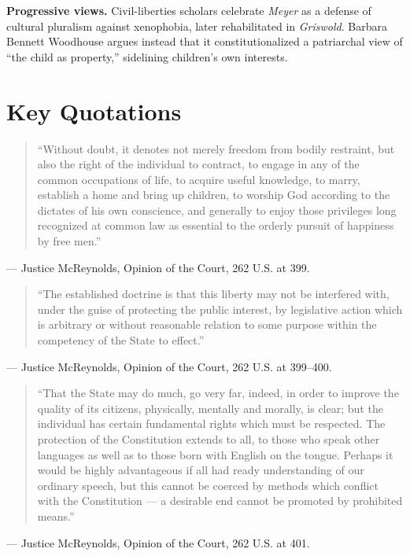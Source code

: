 \documentclass[12pt]{article}
\begin{document}
\textbf{Progressive views.} Civil-liberties scholars celebrate \textit{Meyer} as a defense of cultural pluralism against xenophobia, later rehabilitated in \textit{Griswold}. Barbara Bennett Woodhouse argues instead that it constitutionalized a patriarchal view of ``the child as property,'' sidelining children's own interests.

\section{Key Quotations}

\begin{quote}
``Without doubt, it denotes not merely freedom from bodily restraint, but also the right of the individual to contract, to engage in any of the common occupations of life, to acquire useful knowledge, to marry, establish a home and bring up children, to worship God according to the dictates of his own conscience, and generally to enjoy those privileges long recognized at common law as essential to the orderly pursuit of happiness by free men.''
\end{quote}
\noindent --- Justice McReynolds, Opinion of the Court, 262 U.S. at 399.

\begin{quote}
``The established doctrine is that this liberty may not be interfered with, under the guise of protecting the public interest, by legislative action which is arbitrary or without reasonable relation to some purpose within the competency of the State to effect.''
\end{quote}
\noindent --- Justice McReynolds, Opinion of the Court, 262 U.S. at 399--400.

\begin{quote}
``That the State may do much, go very far, indeed, in order to improve the quality of its citizens, physically, mentally and morally, is clear; but the individual has certain fundamental rights which must be respected. The protection of the Constitution extends to all, to those who speak other languages as well as to those born with English on the tongue. Perhaps it would be highly advantageous if all had ready understanding of our ordinary speech, but this cannot be coerced by methods which conflict with the Constitution --- a desirable end cannot be promoted by prohibited means.''
\end{quote}
\noindent --- Justice McReynolds, Opinion of the Court, 262 U.S. at 401.
\end{document}
